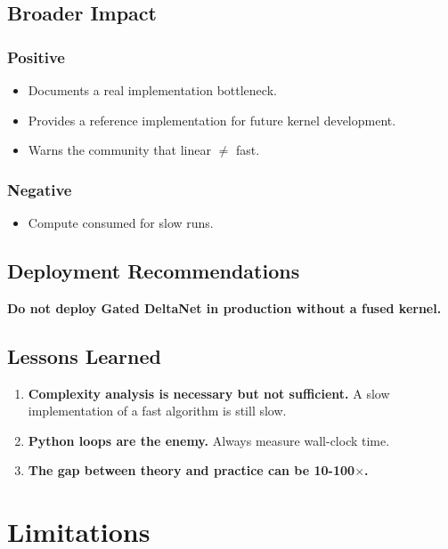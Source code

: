 \subsection{Broader Impact}

\subsubsection{Positive}

\begin{itemize}
\item Documents a real implementation bottleneck.
\item Provides a reference implementation for future kernel development.
\item Warns the community that linear $\ne$ fast.

\end{itemize}
\subsubsection{Negative}

\begin{itemize}
\item Compute consumed for slow runs.

\end{itemize}
\subsection{Deployment Recommendations}

\textbf{Do not deploy Gated DeltaNet in production without a fused kernel.}

\subsection{Lessons Learned}

\begin{enumerate}
\item \textbf{Complexity analysis is necessary but not sufficient.} A slow
  implementation of a fast algorithm is still slow.
\item \textbf{Python loops are the enemy.} Always measure wall-clock time.
\item \textbf{The gap between theory and practice can be 10-100$\times$.}

\end{enumerate}



\section{Limitations}

